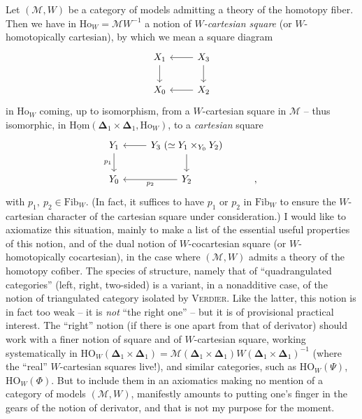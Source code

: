 Let $(\mathcal{M},W)$ be a category of models admitting a theory of the homotopy fiber. Then we have in $\mathrm{Ho}_W=\mathcal{M}W^{-1}$ a notion of \textit{$W$-cartesian square} (or $W$-homotopically cartesian), by which we mean a square diagram
\[
\begin{tikzcd}
X_1 \arrow[d] & X_3 \arrow[l] \arrow[d] \\
X_0 & X_2 \arrow[l]
\end{tikzcd}
\]
in $\mathrm{Ho}_W$ coming, up to isomorphism, from a $W$-cartesian square in $\mathcal{M}$ – thus isomorphic, in $\underline{\mathrm{Hom}}(\boldsymbol{\Delta}_1\times\boldsymbol{\Delta}_1,\mathrm{Ho}_W)$, to a \textit{cartesian} square %
\[
\begin{tikzcd}
Y_1 \arrow[d, "p_1"'] & Y_3\ (\simeq Y_1\times_{Y_0}Y_2) \arrow[l] \arrow[d] & \\
Y_0 & Y_2 \arrow[l, "p_2"] & ,
\end{tikzcd}
\]
with $p_1,\ p_2\in\mathrm{Fib}_W$. (In fact, it suffices to have $p_1$ or $p_2$ in $\mathrm{Fib}_W$ to ensure the $W$-cartesian character of the cartesian square under consideration.) I would like to axiomatize this situation, mainly to make a list of the essential useful properties of this notion, and of the dual notion of $W$-cocartesian square (or $W$-homotopically cocartesian), in the case where $(\mathcal{M},W)$ admits a theory of the homotopy cofiber. The species of structure, namely that of ``quadrangulated categories'' (left, right, two-sided) is a variant, in a  nonadditive case, of the notion of triangulated category isolated by \textsc{Verdier}. Like the latter, this notion is in fact too weak – it is \textit{not} ``the right one'' – but it is of provisional practical interest. The ``right'' notion (if there is one apart from that of derivator) should work with a finer notion of square and of $W$-cartesian square, working systematically in $\mathrm{HO}_W(\boldsymbol{\Delta}_1\times\boldsymbol{\Delta}_1)=\mathcal{M}(\boldsymbol{\Delta}_1\times\boldsymbol{\Delta}_1)W(\boldsymbol{\Delta}_1\times\boldsymbol{\Delta}_1)^{-1}$ (where the ``real'' $W$-cartesian squares live!), and similar categories, such as $\mathrm{HO}_W(\Psi)$, $\mathrm{HO}_W(\Phi)$. But to include them in an axiomatics making no mention of a category of models $(\mathcal{M},W)$, manifestly amounts to putting one's finger in the gears of the notion of derivator, and that is not my purpose for the moment.

